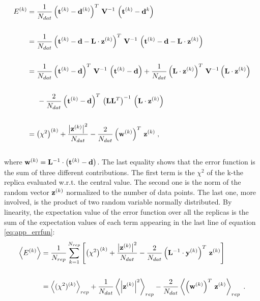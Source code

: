 \\
\begin{equation}
\begin{split}
    E^{(k)} & = \frac{1}{N_{dat}} \left(\mathbf{t}^{(k)} - \mathbf{d}^{(k)}\right)^T \, \mathbf{V}^{-1} \, \left( \mathbf{t}^{(k)} - \mathbf{d}^{k} \right) \\\\
    & = \frac{1}{N_{dat}} \left(\mathbf{t}^{(k)} - \mathbf{d} - \mathbf{L} \cdot \mathbf{z}^{(k)} \right)^T \, \mathbf{V}^{-1} \, \left(\mathbf{t}^{(k)} - \mathbf{d} - \mathbf{L} \cdot \mathbf{z}^{(k)} \right) \\\\
    & = \frac{1}{N_{dat}} \left( \mathbf{t}^{(k)} - \mathbf{d}\right)^T \, \mathbf{V}^{-1} \, \left( \mathbf{t}^{(k)} - \mathbf{d}\right) + \frac{1}{N_{dat}} \left( \mathbf{L} \cdot \mathbf{z}^{(k)} \right)^T \, \mathbf{V}^{-1} \left(  \mathbf{L} \cdot \mathbf{z}^{(k)} \right)\\\\
    & \hspace{5mm} - \frac{2}{N_{dat}} \left( \mathbf{t}^{(k)} - \mathbf{d}\right)^T \, \left(\mathbf{L}\mathbf{L}^{T} \right)^{-1} \, \left(\mathbf{L} \cdot \mathbf{z}^{(k)}\right)\\\\
    & = \left(\chi^2\right)^{(k)} + \frac{\left| \mathbf{z}^{(k)} \right|^2}{N_{dat}} - \frac{2}{N_{dat}} \left(\mathbf{w}^{(k)}\right)^T  \, \mathbf{z}^{(k)} \;,
\end{split}
\label{eq:app_errfun}
\end{equation}
\\
where $\mathbf{w}^{(k)} = \mathbf{L}^{-1} \cdot \left( \mathbf{t}^{(k)} - \mathbf{d} \right)$. The last equality shows that the error function is the sum of three different contributions. The first term is the $\chi^2$ of the k-the replica evaluated w.r.t. the central value. The second one is the norm of the random vector $\mathbf{z}^{(k)}$ normalized to the number of data points. The last one, more involved, is the product of two random variable normally distributed. By linearity, the expectation value of the error function over all the replicas is the sum of the expectation values of each term appearing in the last line of equation \eqref{eq:app_errfun}:
\\
\begin{equation}
\begin{split}
    \left< E^{(k)} \right> & = \frac{1}{N_{rep}} \sum_{k=1}^{N_{rep}} \left[ \left(\chi^2\right)^{(k)} + \frac{\left| \mathbf{z}^{(k)} \right|^2}{N_{dat}} - \frac{2}{N_{dat}} \left( \mathbf{L}^{-1} \cdot \mathbf{y}^{(k)}\right)^T  \, \mathbf{z}^{(k)}\right] \\\\
    & = \left<(\chi^2)^{(k)}\right>_{rep} + \frac{1}{N_{dat}} \left< \left| \mathbf{z}^{(k)} \right|^2 \right>_{rep} - \frac{2}{N_{dat}} \left<\left(\mathbf{w}^{(k)}\right)^T  \, \mathbf{z}^{(k)}\right>_{rep} \;.
\end{split}
\end{equation}
